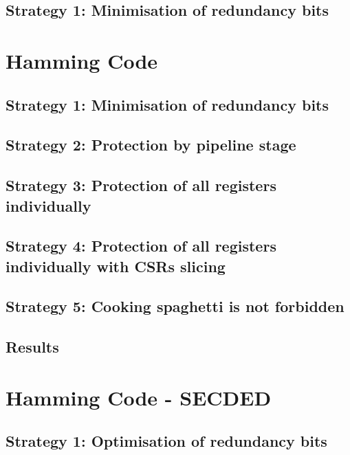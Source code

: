 \subsection{Strategy 1: Minimisation of redundancy bits}

\section{Hamming Code}
\label{section:chap6_hammingcode}

\subsection{Strategy 1: Minimisation of redundancy bits}

\subsection{Strategy 2: Protection by pipeline stage}

\subsection{Strategy 3: Protection of all registers individually}

\subsection{Strategy 4: Protection of all registers individually with CSRs slicing}

\subsection{Strategy 5: Cooking spaghetti is not forbidden}

\subsection{Results}

\section{Hamming Code - SECDED}
\label{section:chap6_secded}

\subsection{Strategy 1: Optimisation of redundancy bits}

